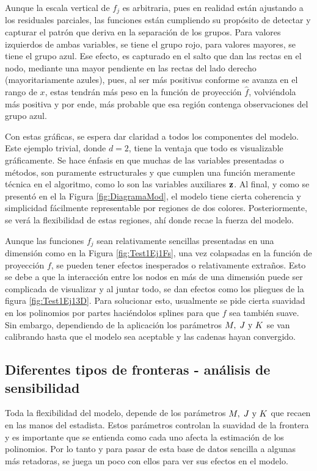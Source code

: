 \documentclass[../Main/Main.tex]{subfiles}
\begin{document}
Aunque la escala vertical de $f_j$ es arbitraria, pues en realidad  están ajustando a los residuales parciales, las funciones están cumpliendo su propósito de detectar y capturar el patrón que deriva en la separación de los grupos. Para valores izquierdos de ambas variables, se tiene el grupo rojo, para valores mayores, se tiene el grupo azul. Ese efecto, es capturado en el salto que dan las rectas en el nodo, mediante una mayor pendiente en las rectas del lado derecho (mayoritariamente azules), pues, al ser más positivas conforme se avanza en el rango de $x$, estas tendrán más peso en la función de proyección $\hat{f}$, volviéndola más positiva y por ende, más probable que esa región contenga observaciones del grupo azul.

Con estas gráficas, se espera dar claridad a todos los componentes del modelo. Este ejemplo trivial, donde $d = 2$, tiene la ventaja que todo es visualizable gráficamente. Se hace énfasis en que muchas de las variables presentadas o métodos, son puramente estructurales y que cumplen una función meramente técnica en el algoritmo, como lo son las variables auxiliares $\mathbf{z}$. Al final, y como se presentó en el la Figura \ref{fig:DiagramaMod}, el modelo tiene cierta coherencia y simplicidad fácilmente representable por regiones de dos colores. Posteriormente, se verá la flexibilidad de estas regiones, ahí donde recae la fuerza del modelo.

Aunque las funciones $f_j$ sean relativamente sencillas presentadas en una dimensión como en la Figura \ref{fig:Test1Ej1Fs}, una vez colapsadas en la función de proyección $f$, se pueden tener efectos inesperados o relativamente extraños. Esto se debe a que la interacción entre los nodos en más de una dimensión puede ser complicada de visualizar y al juntar todo, se dan efectos como los pliegues de la figura \ref{fig:Test1Ej13D}. Para solucionar esto, usualmente se pide cierta suavidad en los polinomios por partes haciéndolos splines para que $f$ sea también suave. Sin embargo, dependiendo de la aplicación los parámetros $M,\;J\text{ y }K$ se van calibrando hasta que el modelo sea aceptable y las cadenas hayan convergido. 

\subsection{Diferentes tipos de fronteras - análisis de sensibilidad } \label{sec:AnlisisSensibilidad}
Toda la flexibilidad del modelo, depende de los parámetros $M,\;J\text{ y }K$ que recaen en las manos del estadista. Estos parámetros controlan la suavidad de la frontera y es importante que se entienda como cada uno afecta la estimación de los polinomios. Por lo tanto y para pasar de esta base de datos sencilla a algunas más retadoras, se juega un poco con ellos para ver sus efectos en el modelo. 
\end{document}
